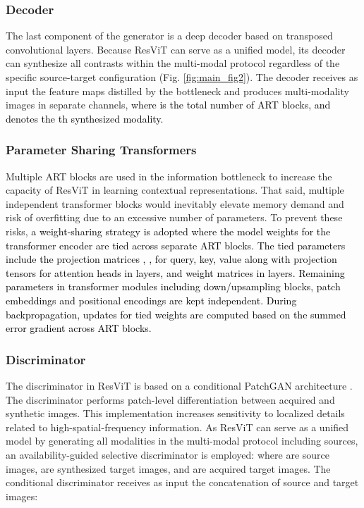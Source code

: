 \documentclass[journal,twoside,web]{ieeecolor}
\newcommand*{\revhl}{\textcolor{black}}
\begin{document}
\subsubsection{Decoder}The last component of the generator is a deep decoder based on transposed convolutional layers. Because ResViT can serve as a unified model, its decoder can synthesize all contrasts within the multi-modal protocol regardless of the specific source-target configuration (Fig. \ref{fig:main_fig2}). The decoder receives as input the feature maps \revhl{} distilled by the bottleneck and produces multi-modality images \revhl{} in separate channels, \revhl{where  is the total number of ART blocks, and  denotes the th synthesized modality.}
\subsubsection{Parameter Sharing Transformers}
Multiple ART blocks are used in the information bottleneck to increase the capacity of ResViT in learning contextual representations. That said, multiple independent transformer blocks would inevitably elevate memory demand and risk of overfitting due to an excessive number of parameters. To prevent these risks, \revhl{a weight-sharing strategy is adopted where the model weights for the transformer encoder are tied across separate ART blocks. The tied parameters include the projection matrices , ,  for query, key, value along with projection tensors for attention heads  in  layers, and weight matrices in  layers. Remaining parameters in transformer modules including down/upsampling blocks, patch embeddings and positional encodings are kept independent. During backpropagation, updates for tied weights are computed based on the summed error gradient across ART blocks.}  

\subsubsection{Discriminator}The discriminator in ResViT is based on a conditional PatchGAN architecture \cite{pix2pix}. The discriminator performs patch-level differentiation between acquired and synthetic images. This implementation increases sensitivity to localized details related to high-spatial-frequency information. As ResViT can serve as a unified model by generating all modalities in the multi-modal protocol including sources, an availability-guided selective discriminator is employed:
\revhl{}
where  are source images,  are synthesized target images, and  are acquired target images. The conditional discriminator receives as input the concatenation of source and target images:
\end{document}
